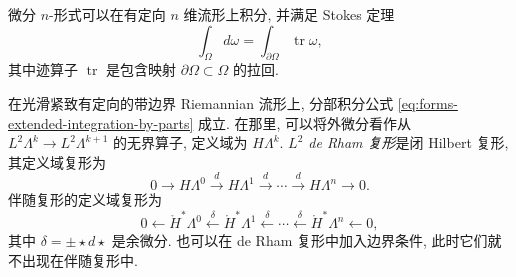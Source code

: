 \begin{tcolorbox}[enhanced,breakable,colback=KuangNei,frame hidden,boxrule=0pt,sharpish corners,before skip=10pt,after skip=10pt]
{微分 $n$-形式可以在有定向 $n$ 维流形上积分, 并满足 Stokes 定理}
\[
\int_\Omega d\omega=\int_{\partial\Omega}\operatorname{tr}\omega,
\]
{其中迹算子 $\operatorname{tr}$ 是包含映射 $\partial\Omega\subset\Omega$ 的拉回.}

{在光滑紧致有定向的带边界 Riemannian 流形上, 分部积分公式 \eqref{eq:forms-extended-integration-by-parts} 成立. 在那里, 可以将外微分看作从 $L^2\Lambda^k\to L^2\Lambda^{k+1}$ 的无界算子, 定义域为 $H\Lambda^k$. \emph{$L^2$ de Rham 复形}是闭 Hilbert 复形, 其定义域复形为}
\[
0\to H\Lambda^0\xrightarrow{d}H\Lambda^1\xrightarrow{d}\cdots\xrightarrow{d}H\Lambda^n\to0.
\]
{伴随复形的定义域复形为}
\[
0\leftarrow\mathring H^*\Lambda^0\xleftarrow{\delta}\mathring H^*\Lambda^1\xleftarrow{\delta}\cdots\xleftarrow{\delta}\mathring H^*\Lambda^n\leftarrow0,
\]
{其中 $\delta=\pm\star d\star$ 是余微分. 也可以在 de Rham 复形中加入边界条件, 此时它们就不出现在伴随复形中.}
\end{tcolorbox}

